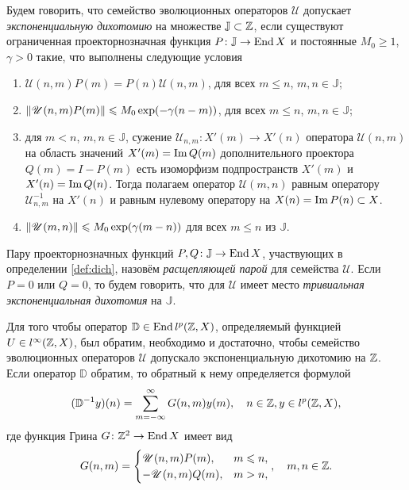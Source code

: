 \begin{definition}\label{def:dich}
    Будем говорить, что семейство эволюционных операторов $\mathcal U$ допускает \emph{экспоненциальную дихотомию} на множестве $\mathbb J \subset \mathbb{Z}$, если существуют ограниченная проекторнозначная функция $P \colon \mathbb J \to \operatorname{End} X$ и постоянные $M_0 \geq 1$, $\gamma > 0$ такие, что выполнены следующие условия
    \begin{enumerate}
        \item $\mathcal U(n, m) P(m) = P(n) \mathcal U(n, m)$, для всех $m \leq n$, $m, n \in \mathbb J$;
        \item $\left\|\mathcal U(n, m) P(m)\right\| \leqslant M_0 \exp(-\gamma (n - m))$, для всех $m \leq n$, $m, n \in \mathbb J$;
        \item для $m < n$, $m, n \in \mathbb J$, сужение $\mathcal U_{n, m}: X'(m) \to X'(n)$ оператора $\mathcal U(n, m)$ на область значений $X'(m) = \operatorname{Im} Q(m)$ дополнительного проектора $Q(m) = I - P(m)$ есть изоморфизм подпространств $X'(m)$ и $X'(n) = \operatorname{Im} Q(n)$.
        Тогда полагаем оператор $\mathcal U(m, n)$ равным оператору $\mathcal U_{n, m}^{-1}$ на $X'(n)$ и равным нулевому оператору на $X(n) = \operatorname{Im} P(n) \subset X$.
        \item $\left\|\mathcal U(m, n)\right\| \leqslant M_0 \exp(\gamma (m - n))$ для всех $m \leq n$ из $\mathbb J$.
    \end{enumerate}
\end{definition}
Пару проекторнозначных функций $P, Q\colon \mathbb J \to \operatorname{End} X$, участвующих в определении \ref{def:dich}, назовём \emph{расщепляющей парой} для семейства $\mathcal U$. Если $P= 0$ или $Q = 0$, то будем говорить, что для $\mathcal U$ имеет место \emph{тривиальная экспоненциальная дихотомия} на $\mathbb J$.

\begin{theorem}\label{th:dich}
    Для того чтобы оператор $\mathbb D \in \operatorname{End} l^p(\mathbb{Z}, X)$, определяемый функцией $U \in l^\infty(\mathbb{Z}, X)$, был обратим, необходимо и достаточно, чтобы семейство эволюционных операторов $\mathcal U$ допускало экспоненциальную дихотомию на $\mathbb{Z}$. Если оператор $\mathbb D$ обратим, то обратный к нему определяется формулой
    \[ (\mathbb D^{-1} y)(n) = \sum_{m=-\infty}^\infty G(n, m) y(m), \quad n \in \mathbb{Z}, y \in l^p(\mathbb{Z}, X),\]
    где функция Грина $G\colon \mathbb{Z}^2 \to \operatorname{End} X$ имеет вид
    \[ G(n, m) = \begin{cases}
        \mathcal U(n, m) P(m), & m \leqslant n, \\
        -\mathcal U(n, m) Q(m),& m > n,
    \end{cases}, \quad m, n \in \mathbb{Z}. \]
\end{theorem}


